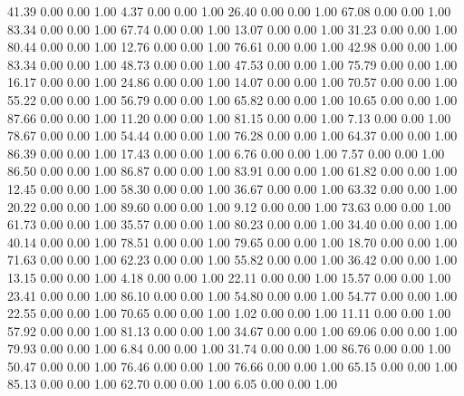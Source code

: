    41.39   0.00   0.00   1.00
    4.37   0.00   0.00   1.00
   26.40   0.00   0.00   1.00
   67.08   0.00   0.00   1.00
   83.34   0.00   0.00   1.00
   67.74   0.00   0.00   1.00
   13.07   0.00   0.00   1.00
   31.23   0.00   0.00   1.00
   80.44   0.00   0.00   1.00
   12.76   0.00   0.00   1.00
   76.61   0.00   0.00   1.00
   42.98   0.00   0.00   1.00
   83.34   0.00   0.00   1.00
   48.73   0.00   0.00   1.00
   47.53   0.00   0.00   1.00
   75.79   0.00   0.00   1.00
   16.17   0.00   0.00   1.00
   24.86   0.00   0.00   1.00
   14.07   0.00   0.00   1.00
   70.57   0.00   0.00   1.00
   55.22   0.00   0.00   1.00
   56.79   0.00   0.00   1.00
   65.82   0.00   0.00   1.00
   10.65   0.00   0.00   1.00
   87.66   0.00   0.00   1.00
   11.20   0.00   0.00   1.00
   81.15   0.00   0.00   1.00
    7.13   0.00   0.00   1.00
   78.67   0.00   0.00   1.00
   54.44   0.00   0.00   1.00
   76.28   0.00   0.00   1.00
   64.37   0.00   0.00   1.00
   86.39   0.00   0.00   1.00
   17.43   0.00   0.00   1.00
    6.76   0.00   0.00   1.00
    7.57   0.00   0.00   1.00
   86.50   0.00   0.00   1.00
   86.87   0.00   0.00   1.00
   83.91   0.00   0.00   1.00
   61.82   0.00   0.00   1.00
   12.45   0.00   0.00   1.00
   58.30   0.00   0.00   1.00
   36.67   0.00   0.00   1.00
   63.32   0.00   0.00   1.00
   20.22   0.00   0.00   1.00
   89.60   0.00   0.00   1.00
    9.12   0.00   0.00   1.00
   73.63   0.00   0.00   1.00
   61.73   0.00   0.00   1.00
   35.57   0.00   0.00   1.00
   80.23   0.00   0.00   1.00
   34.40   0.00   0.00   1.00
   40.14   0.00   0.00   1.00
   78.51   0.00   0.00   1.00
   79.65   0.00   0.00   1.00
   18.70   0.00   0.00   1.00
   71.63   0.00   0.00   1.00
   62.23   0.00   0.00   1.00
   55.82   0.00   0.00   1.00
   36.42   0.00   0.00   1.00
   13.15   0.00   0.00   1.00
    4.18   0.00   0.00   1.00
   22.11   0.00   0.00   1.00
   15.57   0.00   0.00   1.00
   23.41   0.00   0.00   1.00
   86.10   0.00   0.00   1.00
   54.80   0.00   0.00   1.00
   54.77   0.00   0.00   1.00
   22.55   0.00   0.00   1.00
   70.65   0.00   0.00   1.00
    1.02   0.00   0.00   1.00
   11.11   0.00   0.00   1.00
   57.92   0.00   0.00   1.00
   81.13   0.00   0.00   1.00
   34.67   0.00   0.00   1.00
   69.06   0.00   0.00   1.00
   79.93   0.00   0.00   1.00
    6.84   0.00   0.00   1.00
   31.74   0.00   0.00   1.00
   86.76   0.00   0.00   1.00
   50.47   0.00   0.00   1.00
   76.46   0.00   0.00   1.00
   76.66   0.00   0.00   1.00
   65.15   0.00   0.00   1.00
   85.13   0.00   0.00   1.00
   62.70   0.00   0.00   1.00
    6.05   0.00   0.00   1.00
